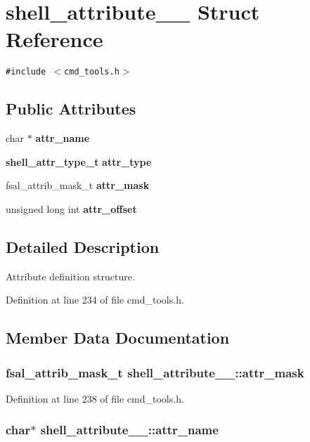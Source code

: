 \section{shell\_\-attribute\_\-\_\- Struct Reference}
\label{structshell__attribute____}
{\tt \#include $<$cmd\_\-tools.h$>$}

\subsection*{Public Attributes}
\begin{CompactItemize}
\item 
char $\ast$ {\bf attr\_\-name}
\item 
{\bf shell\_\-attr\_\-type\_\-t} {\bf attr\_\-type}
\item 
fsal\_\-attrib\_\-mask\_\-t {\bf attr\_\-mask}
\item 
unsigned long int {\bf attr\_\-offset}
\end{CompactItemize}


\subsection{Detailed Description}
Attribute definition structure. 

Definition at line 234 of file cmd\_\-tools.h.

\subsection{Member Data Documentation}
\subsubsection[{attr\_\-mask}]{\setlength{\rightskip}{0pt plus 5cm}fsal\_\-attrib\_\-mask\_\-t {\bf shell\_\-attribute\_\-\_\-::attr\_\-mask}}\label{structshell__attribute_____975e907b2930a059e71faa41725aa853}




Definition at line 238 of file cmd\_\-tools.h.
\subsubsection[{attr\_\-name}]{\setlength{\rightskip}{0pt plus 5cm}char$\ast$ {\bf shell\_\-attribute\_\-\_\-::attr\_\-name}}\label{structshell__attribute_____20b64795e8300f56437578bd7fd99be9}




